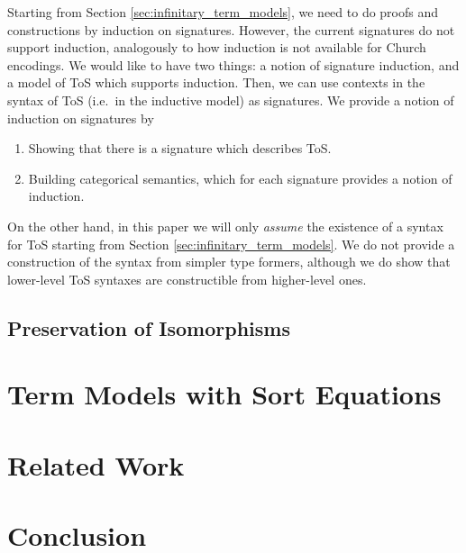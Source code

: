 \documentclass{llncs}
\begin{document}

Starting from Section \ref{sec:infinitary_term_models}, we need to do proofs and
constructions by induction on signatures. However, the current signatures do not
support induction, analogously to how induction is not available for Church
encodings. We would like to have two things: a notion of signature induction,
and a model of ToS which supports induction. Then, we can use contexts in the
syntax of ToS (i.e.\ in the inductive model) as signatures. We provide a notion
of induction on signatures by
\begin{enumerate}
  \item Showing that there is a signature which describes ToS.
  \item Building categorical semantics, which for each signature provides a notion of induction.
\end{enumerate}
On the other hand, in this paper we will only \emph{assume} the existence of a
syntax for ToS starting from Section \ref{sec:infinitary_term_models}. We do not provide a
construction of the syntax from simpler type formers, although we do show that
lower-level ToS syntaxes are constructible from higher-level ones.

\subsection{Preservation of Isomorphisms}

\section{Term Models with Sort Equations}
\label{sec:sort_term}

\section{Related Work}
\label{sec:related}

\section{Conclusion}
\label{sec:conclusion}


\end{document}
